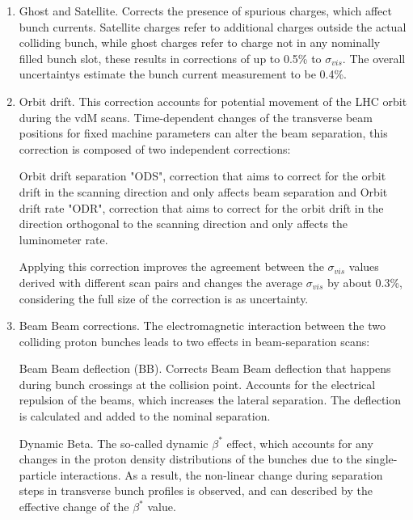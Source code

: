 \begin{enumerate}

\item Ghost and Satellite. Corrects the presence of spurious charges, which affect bunch currents. Satellite charges refer to additional charges outside the actual colliding bunch, while ghost charges refer to charge not in any nominally filled bunch slot, these results in corrections of up to 0.5\% to $\sigma_{vis}$. The overall uncertaintys estimate the bunch current measurement  to be 0.4\%.

\item Orbit drift. This correction accounts for potential movement of the LHC orbit during the vdM scans. Time-dependent changes of the transverse beam positions for fixed machine parameters can alter the beam separation, this correction is composed of two independent corrections:  

Orbit drift separation "ODS", correction that aims to correct for the orbit drift in the scanning direction and only affects beam separation and  Orbit drift rate "ODR", correction that aims to correct for the orbit drift in the direction orthogonal to the scanning direction and only affects the luminometer rate. 

Applying this correction improves the agreement between the $\sigma_{vis}$ values derived with different scan pairs and changes the average $\sigma_{vis}$ by about 0.3\%, considering the full size of the correction is as uncertainty.

\item Beam Beam corrections.  The electromagnetic interaction between the two colliding proton bunches leads to two effects in beam-separation scans:

Beam Beam deflection (BB). Corrects Beam Beam deflection that happens during bunch crossings at the collision point. Accounts for the electrical repulsion of the beams, which increases the lateral separation. The deflection is calculated and added to the nominal separation.

Dynamic Beta. The so-called dynamic $\beta^{*}$  effect, which accounts for any changes in the proton density distributions of the bunches due to the single-particle interactions. As a result, the non-linear change during separation steps in transverse bunch profiles is observed, and can described by the effective change of the $\beta^{*}$  value.


\end{enumerate}
